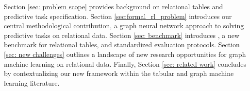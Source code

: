  Section \ref{sec: problem scope} provides background on relational tables and predictive task specification. 
Section \ref{sec:formal_rl_problem} introduces our central methodological contribution, a graph neural network approach to solving predictive tasks on relational data.
Section \ref{sec: benchmark} introduces {\em \BenchmarkName}, a new benchmark for relational tables, and standardized evaluation protocols. 
Section \ref{sec: new challenges} outlines a landscape of new research opportunities for graph machine learning on relational data. Finally, Section \ref{sec: related work} concludes by contextualizing our new framework within the tabular and graph machine learning literature.

